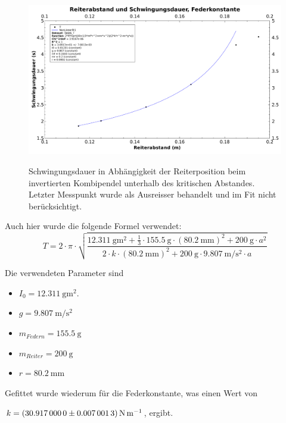 \begin{figure}[h!]
    \centering
    \includegraphics[width=\textwidth]{images/332.pdf}
    \label{fig:pendelKonfigs}
    \caption{%
        Schwingungsdauer in Abh\"angigkeit der Reiterposition beim invertierten Kombipendel unterhalb des kritischen Abstandes. Letzter Messpunkt wurde als Ausreisser behandelt und im Fit nicht ber\"ucksichtigt.
    }
\end{figure}

Auch hier wurde die folgende Formel verwendet:
\begin{equation}
    T = 2 \cdot \pi \cdot \sqrt{\frac{\SI{12.311}{\gram\meter\squared} + \frac{1}{3} \cdot \SI{155.5}{\gram} \cdot (\SI{80.2}{\milli\meter})^2 + \SI{200}{\gram} \cdot a^2}{2 \cdot k \cdot (\SI{80.2}{\milli\meter})^2 + \SI{200}{\gram} \cdot
    \SI{9.807}{\meter\per\second\squared} \cdot a}}
\end{equation}

Die verwendeten Parameter sind
\begin{itemize}
    \item
        $I_0  = \SI[separate-uncertainty = true]{12.311}{\gram\meter\squared}$.
    \item
        $g = \SI{9.807}{\meter\per\second\squared}$
    \item
        $m_{Federn} = \SI{155.5}{\gram}$
    \item
        $m_{Reiter} = \SI{200}{\gram}$
    \item
        $r = \SI{80.2}{\milli\meter}$
\end{itemize}

Gefittet wurde  wiederum f\"ur  die Federkonstante,  was einen  Wert von

$k = \SI[separate-uncertainty  =  true]{30.917 \pm  0.0070013}{\newton\per\meter}$, ergibt.

